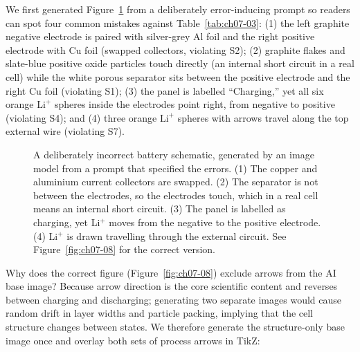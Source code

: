 We first generated Figure~\ref{fig:ch07-07} from a deliberately error-inducing prompt so readers can spot four common mistakes against Table~\ref{tab:ch07-03}: (1) the left graphite negative electrode is paired with silver-grey Al foil and the right positive electrode with Cu foil (swapped collectors, violating S2); (2) graphite flakes and slate-blue positive oxide particles touch directly (an internal short circuit in a real cell) while the white porous separator sits between the positive electrode and the right Cu foil (violating S1); (3) the panel is labelled ``Charging,'' yet all six orange $\text{Li}^+$ spheres inside the electrodes point right, from negative to positive (violating S4); and (4) three orange $\text{Li}^+$ spheres with arrows travel along the top external wire (violating S7).

\begin{figure}[htbp]\centering

\caption{A deliberately incorrect battery schematic, generated by an image model from a prompt that specified the errors. (1) The copper and aluminium current collectors are swapped. (2) The separator is not between the electrodes, so the electrodes touch, which in a real cell means an internal short circuit. (3) The panel is labelled as charging, yet Li$^+$ moves from the negative to the positive electrode. (4) Li$^+$ is drawn travelling through the external circuit. See Figure~\ref{fig:ch07-08} for the correct version.}\label{fig:ch07-07}
\end{figure}

Why does the correct figure (Figure~\ref{fig:ch07-08}) exclude arrows from the AI base image? Because arrow direction is the core scientific content and reverses between charging and discharging; generating two separate images would cause random drift in layer widths and particle packing, implying that the cell structure changes between states. We therefore generate the structure-only base image once and overlay both sets of process arrows in TikZ:

